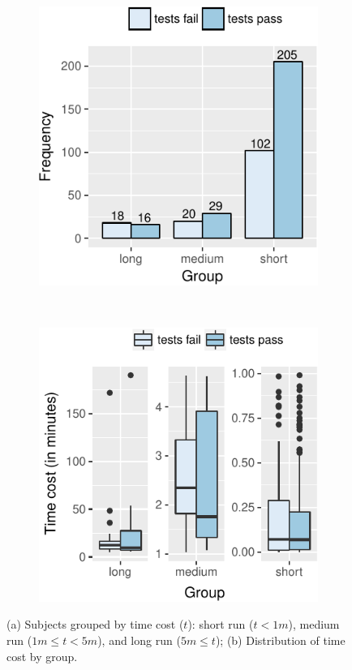 \begin{figure}[ht]
    \centering
    \begin{subfigure}{0.24\textwidth}
        \centering
        \includegraphics[width=\textwidth]{plots/barplot-timecost.pdf}
        \caption{\label{fig:rq1-barplot}}
    \end{subfigure}%
    ~
    \begin{subfigure}{0.24\textwidth}
        \centering
        \includegraphics[width=\textwidth]{plots/boxplot-timecost.pdf}
        \caption{\label{fig:rq1-boxplot}}
    \end{subfigure}%
    \caption{(a) Subjects grouped by time cost ($t$): short run ($t <
    1m$), medium run ($1m \le t < 5m$), and long run ($5m \le t$); (b)
    Distribution of time cost by group.}
\end{figure}

